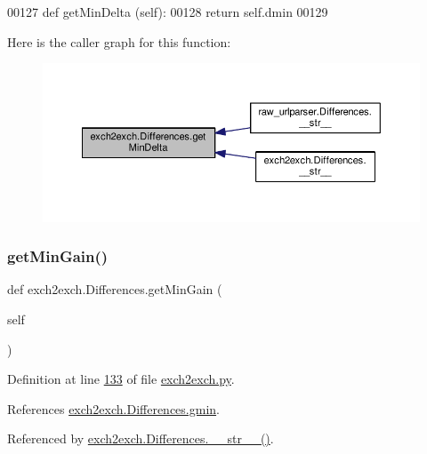 \begin{DoxyCode}
00127     \textcolor{keyword}{def }getMinDelta (self):
00128         \textcolor{keywordflow}{return} self.dmin
00129         
\end{DoxyCode}
Here is the caller graph for this function\+:
\nopagebreak
\begin{figure}[H]
\begin{center}
\leavevmode
\includegraphics[width=350pt]{classexch2exch_1_1_differences_ad2c60e37e0a390dd89be5d9388e552a4_icgraph}
\end{center}
\end{figure}
\mbox{\label{classexch2exch_1_1_differences_a110cb3a79f744b6d3911b6669b8a0a89}} 
\subsubsection{\texorpdfstring{get\+Min\+Gain()}{getMinGain()}}
{\footnotesize\ttfamily def exch2exch.\+Differences.\+get\+Min\+Gain (\begin{DoxyParamCaption}\item[{}]{self }\end{DoxyParamCaption})}



Definition at line \hyperlink{exch2exch_8py_source_l00133}{133} of file \hyperlink{exch2exch_8py_source}{exch2exch.\+py}.



References \hyperlink{exch2exch_8py_source_l00118}{exch2exch.\+Differences.\+gmin}.



Referenced by \hyperlink{exch2exch_8py_source_l00154}{exch2exch.\+Differences.\+\_\+\+\_\+str\+\_\+\+\_\+()}.


